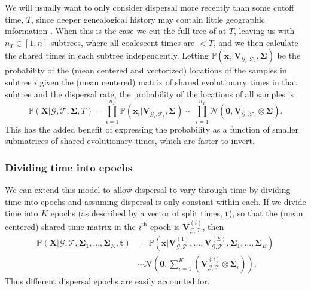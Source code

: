 \documentclass[12pt]{article}
\begin{document}
We will usually want to only consider dispersal more recently than some cutoff time, $T$, since deeper genealogical history may contain little geographic information \citep{wilkins2004separation}.
When this is the case we cut the full tree of at $T$, leaving us with $n_T \in [1, n ] $ subtrees, where all coalescent times are $<T$, and we then calculate the shared times in each subtree independently.
Letting $\mathbb{P}(\mathbf{x}_i | \mathbf{V}_{\mathcal{G}_i,\mathcal{T}_i}, \mathbf{\Sigma})$ be the probability of the (mean centered and vectorized) locations of the samples in subtree $i$ given the (mean centered) matrix of shared evolutionary times in that subtree and the dispersal rate, the probability of the locations of all samples is
%
\begin{equation}\label{eq:PScentered_chopped}
\mathbb{P}(\mathbf{X} | \mathcal{G},\mathcal{T}, \mathbf{\Sigma}, T) = \prod_{i=1}^{n_T} \mathbb{P}(\mathbf{x}_i | \mathbf{V}_{\mathcal{G}_i,\mathcal{T}_i}, \mathbf{\Sigma}) \sim \prod_{i=1}^{n_T} \mathcal{N}\left(\mathbf{0}, \mathbf{V}_{\mathcal{G}_i,\mathcal{T}_i} \otimes \mathbf{\Sigma} \right). %
\end{equation} 
This has the added benefit of expressing the probability as a function of smaller submatrices of shared evolutionary times, which are faster to invert.

\subsubsection*{Dividing time into epochs}

We can extend this model to allow dispersal to vary through time by dividing time into epochs and assuming dispersal is only constant within each. 
If we divide time into $K$ epochs (as described by a vector of split times, $\mathbf{t}$), so that the (mean centered) shared time matrix in the $i^\mathrm{th}$ epoch is $\mathbf{V}_{\mathcal{G},\mathcal{T}}^{(i)}$, then
%
\begin{equation}\label{eq:PScentered_epochs}
\begin{aligned}
\mathbb{P}(\mathbf{X} | \mathcal{G},\mathcal{T}, \mathbf{\Sigma}_1, ..., \mathbf{\Sigma}_K, \mathbf{t}) &= \mathbb{P}(\mathbf{x} | \mathbf{V}_{\mathcal{G},\mathcal{T}}^{(1)}, ..., \mathbf{V}_{\mathcal{G},\mathcal{T}}^{(E)}, \mathbf{\Sigma}_1, ..., \mathbf{\Sigma}_E)\\
& \sim \mathcal{N}\left(\mathbf{0}, \sum_{i=1}^{K} ( \mathbf{V}_{\mathcal{G},\mathcal{T}}^{(i)} \otimes \mathbf{\Sigma}_i ) \right).
\end{aligned}
\end{equation}
Thus different dispersal epochs are easily accounted for.
\end{document}
